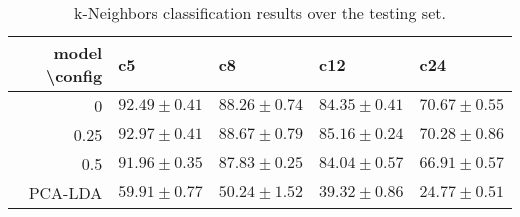 \begin{table*}[h]
\begin{center}
\caption{k-Neighbors classification results over the testing set.}
\small
\begin{tabular}{rllll}
\hline
model \textbackslash config & c5  & c8  & c12   & c24   \\
\hline
 0    & $92.49\pm0.41$ & $88.26\pm0.74$ & $84.35\pm0.41$ & $70.67\pm0.55$ \\
 0.25 & $92.97\pm0.41$ & $88.67\pm0.79$ & $85.16\pm0.24$ & $70.28\pm0.86$ \\
 0.5  & $91.96\pm0.35$ & $87.83\pm0.25$ & $84.04\pm0.57$ & $66.91\pm0.57$ \\
 \hline
 PCA-LDA  & $59.91\pm0.77$ & $50.24\pm1.52$ & $39.32\pm0.86$ & $24.77\pm0.51$ \\
\hline
\end{tabular}
\label{tab:things}
\end{center}
\end{table*}


